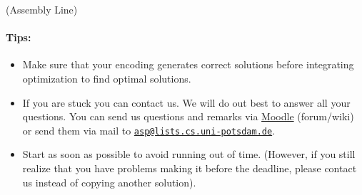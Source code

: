 \documentclass[a4paper,12pt]{article}
\begin{document}
\begin{PraktikumsAufgabe}{2}{(Assembly Line)}
\paragraph{Tips:}
\begin{itemize}
\item Make sure that your encoding generates correct solutions before integrating optimization to find optimal solutions.
\item If you are stuck you can contact us. We will do out best to answer all your questions.
      You can send us questions and remarks via 
      \href{http://moodle.cs.uni-potsdam.de/course/view.php?id=39}{Moodle} (forum/wiki)
      or send them via mail to 
      \href{mailto:asp@lists.cs.uni-potsdam.de}{\texttt{asp@lists.cs.uni-potsdam.de}}.
\item Start as soon as possible to avoid running out of time.
      (However, if you still realize that you have problems making it before the deadline,
       please contact us instead of copying another solution).
\end{itemize}

\end{PraktikumsAufgabe}
\end{document}
